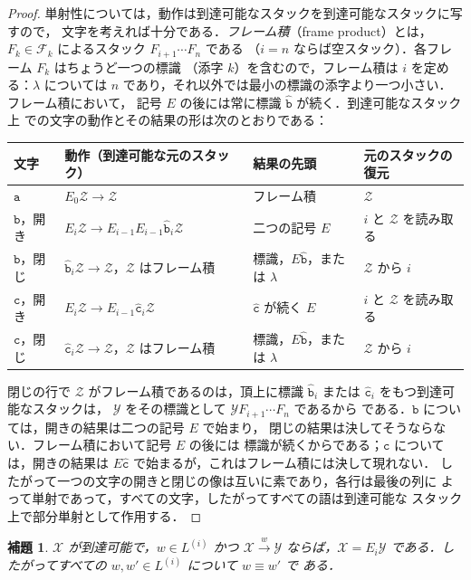 \documentclass[11pt,a4paper]{ltjsarticle}
\numberwithin{equation}{section}
\theoremstyle{plain}
\newtheorem{lemma}[theorem]{補題}
\theoremstyle{definition}
\theoremstyle{remark}
\theoremstyle{plain}
\newcommand{\eps}{\lambda}
\begin{document}
\begin{proof}
単射性については，動作は到達可能なスタックを到達可能なスタックに写すので，
文字を考えれば十分である．\emph{フレーム積}（frame product）とは，
$F_k\in\mathcal F_k$ によるスタック $F_{i+1}\cdots F_n$ である
（$i=n$ ならば空スタック）．各フレーム $F_k$ はちょうど一つの標識
（添字 $k$）を含むので，フレーム積は $i$ を定める：$\eps$ については $n$
であり，それ以外では最小の標識の添字より一つ小さい．フレーム積において，
記号 $E$ の後には常に標識 $\hat{\mathtt b}$ が続く．到達可能なスタック上
での文字の動作とその結果の形は次のとおりである：
\begin{center}
\footnotesize
\renewcommand{\arraystretch}{1.15}
\begin{tabular}{@{}llll@{}}
\hline
文字 & 動作（到達可能な元のスタック） & 結果の先頭 & 元のスタックの復元\\
\hline
$\mathtt a$ & $E_0\mathcal Z\to\mathcal Z$ & フレーム積 & $\mathcal Z$\\
$\mathtt b$，開き & $E_i\mathcal Z\to E_{i-1}E_{i-1}\hat{\mathtt b}_i\mathcal Z$ & 二つの記号 $E$ & $i$ と $\mathcal Z$ を読み取る\\
$\mathtt b$，閉じ & $\hat{\mathtt b}_i\mathcal Z\to\mathcal Z$，$\mathcal Z$ はフレーム積 & 標識，$E\hat{\mathtt b}$，または $\eps$ & $\mathcal Z$ から $i$\\
$\mathtt c$，開き & $E_i\mathcal Z\to E_{i-1}\hat{\mathtt c}_i\mathcal Z$ & $\hat{\mathtt c}$ が続く $E$ & $i$ と $\mathcal Z$ を読み取る\\
$\mathtt c$，閉じ & $\hat{\mathtt c}_i\mathcal Z\to\mathcal Z$，$\mathcal Z$ はフレーム積 & 標識，$E\hat{\mathtt b}$，または $\eps$ & $\mathcal Z$ から $i$\\
\hline
\end{tabular}
\end{center}
閉じの行で $\mathcal Z$ がフレーム積であるのは，頂上に標識
$\hat{\mathtt b}_i$ または $\hat{\mathtt c}_i$ をもつ到達可能なスタックは，
$\mathcal Y$ をその標識として $\mathcal YF_{i+1}\cdots F_n$ であるから
である．$\mathtt b$ については，開きの結果は二つの記号 $E$ で始まり，
閉じの結果は決してそうならない．フレーム積において記号 $E$ の後には
標識が続くからである；$\mathtt c$ については，開きの結果は
$E\hat{\mathtt c}$ で始まるが，これはフレーム積には決して現れない．
したがって一つの文字の開きと閉じの像は互いに素であり，各行は最後の列に
よって単射であって，すべての文字，したがってすべての語は到達可能な
スタック上で部分単射として作用する．
\end{proof}

\begin{lemma}\label{lem:app-br-exchange}
\label{lem:app-tl-exchange}
$\mathcal X$ が到達可能で，$w\in L^{(i)}$ かつ
$\mathcal X\xrightarrow{w}\mathcal Y$ ならば，$\mathcal X=E_i\mathcal Y$
である．したがってすべての $w,w'\in L^{(i)}$ について $w\equiv w'$ で
ある．
\end{lemma}
\end{document}
